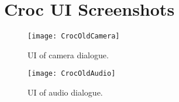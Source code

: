 \chapter{Croc UI Screenshots}\label{app:crocUI}
\begin{figure}[h]
	\centering
	\texttt{[image: CrocOldCamera]}
	\caption{UI of camera dialogue.}
\end{figure}

\begin{figure}[h]
	\centering
	\texttt{[image: CrocOldAudio]}
	\caption{UI of audio dialogue.}
\end{figure}



